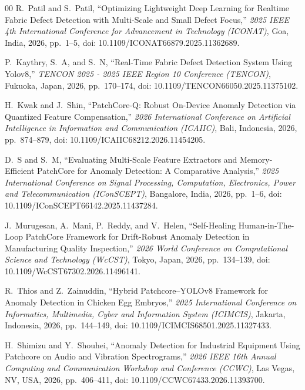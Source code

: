 \documentclass{ieeeaccess}
\begin{document}
\begin{thebibliography}{00}
 R.~Patil and S.~Patil, ``Optimizing Lightweight Deep Learning for Realtime Fabric Defect Detection with Multi-Scale and Small Defect Focus,'' \textit{2025 IEEE 4th International Conference for Advancement in Technology (ICONAT)}, Goa, India, 2026, pp.~1--5, doi: 10.1109/ICONAT66879.2025.11362689.

 P.~Kaythry, S.~A, and S.~N, ``Real-Time Fabric Defect Detection System Using Yolov8,'' \textit{TENCON 2025 - 2025 IEEE Region 10 Conference (TENCON)}, Fukuoka, Japan, 2026, pp.~170--174, doi: 10.1109/TENCON66050.2025.11375102.

 H.~Kwak and J.~Shin, ``PatchCore-Q: Robust On-Device Anomaly Detection via Quantized Feature Compensation,'' \textit{2026 International Conference on Artificial Intelligence in Information and Communication (ICAIIC)}, Bali, Indonesia, 2026, pp.~874--879, doi: 10.1109/ICAIIC68212.2026.11454205.

 D.~S and S.~M, ``Evaluating Multi-Scale Feature Extractors and Memory-Efficient PatchCore for Anomaly Detection: A Comparative Analysis,'' \textit{2025 International Conference on Signal Processing, Computation, Electronics, Power and Telecommunication (IConSCEPT)}, Bangalore, India, 2026, pp.~1--6, doi: 10.1109/IConSCEPT66142.2025.11437284.

 J.~Murugesan, A.~Mani, P.~Reddy, and V.~Helen, ``Self-Healing Human-in-The-Loop PatchCore Framework for Drift-Robust Anomaly Detection in Manufacturing Quality Inspection,'' \textit{2026 World Conference on Computational Science and Technology (WcCST)}, Tokyo, Japan, 2026, pp.~134--139, doi: 10.1109/WcCST67302.2026.11496141.

 R.~Thios and Z.~Zainuddin, ``Hybrid Patchcore--YOLOv8 Framework for Anomaly Detection in Chicken Egg Embryos,'' \textit{2025 International Conference on Informatics, Multimedia, Cyber and Information System (ICIMCIS)}, Jakarta, Indonesia, 2026, pp.~144--149, doi: 10.1109/ICIMCIS68501.2025.11327433.

 H.~Shimizu and Y.~Shouhei, ``Anomaly Detection for Industrial Equipment Using Patchcore on Audio and Vibration Spectrograms,'' \textit{2026 IEEE 16th Annual Computing and Communication Workshop and Conference (CCWC)}, Las Vegas, NV, USA, 2026, pp.~406--411, doi: 10.1109/CCWC67433.2026.11393700.

\end{thebibliography}
\end{document}
